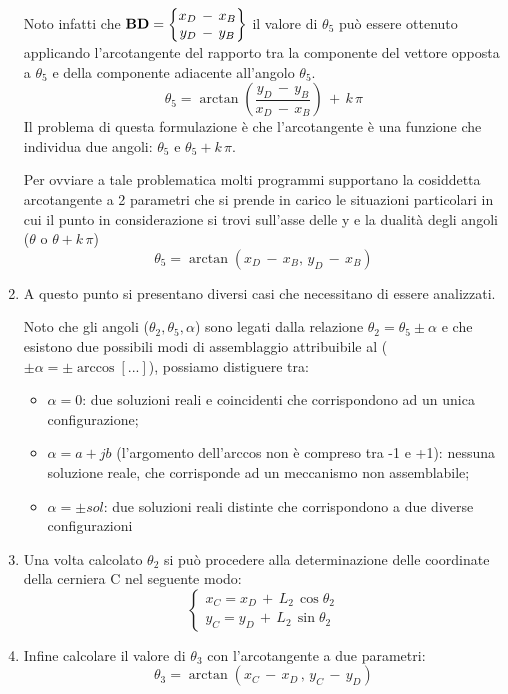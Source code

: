 \begin{enumerate}
		 Noto infatti che $\mathbf{BD} = \begin{Bmatrix}x_D\,-\,x_B\\y_D\,-\,y_B\end{Bmatrix}$ il valore di $\theta_5$ può essere ottenuto applicando l'arcotangente del rapporto tra la componente del vettore opposta a $\theta_5$ e della componente adiacente all'angolo $\theta_5$.
		 \[\theta_5 = \arctan{(\frac{y_D\,-\,y_B}{x_D\,-\,x_B})}\,+\,k\,\pi\]
		 Il problema di questa formulazione è che l'arcotangente è una funzione che individua due angoli: $\theta_5$ e $\theta_5 + k\,\pi$.
		 
		 Per ovviare a tale problematica molti programmi supportano la cosiddetta arcotangente a 2 parametri che si prende in carico le situazioni particolari in cui il punto in considerazione si trovi sull'asse delle y e la dualità degli angoli ($\theta$ o $\theta + k\,\pi$)
		 \[\theta_5 = \arctan{(x_D\,-\,x_B,\,y_D\,-\,x_B)}\]
		 \item A questo punto si presentano diversi casi che necessitano di essere analizzati.
		 
		 Noto che gli angoli ($\theta_2, \theta_5 , \alpha$) sono legati dalla relazione $\theta_2 = \theta_5 \pm \alpha$ e che esistono due possibili modi di assemblaggio attribuibile al ($\pm \alpha = \pm \arccos{[...]}$), possiamo distiguere tra:
		 \begin{itemize}
		 \item $\alpha = 0$: due soluzioni reali e coincidenti che corrispondono ad un unica configurazione;
		 \item $\alpha = a + j b$ (l'argomento dell'arccos non è compreso tra -1 e +1): nessuna soluzione reale, che corrisponde ad un meccanismo non assemblabile;
		 \item $\alpha = \pm sol$: due soluzioni reali distinte che corrispondono a due diverse configurazioni
		 \end{itemize}
		 
		 \item Una volta calcolato $\theta_2$ si può procedere alla determinazione delle coordinate della cerniera C nel seguente modo:
		 \[
		 \begin{cases}
		 	x_C = x_D\,+\,L_2\,\cos{\theta_2}\\
		 	y_C = y_D\,+\,L_2\,\sin{\theta_2}
		 \end{cases}
		 \]
		 \item Infine calcolare il valore di $\theta_3$ con l'arcotangente a due parametri:
		 \[\theta_3 = \arctan{(x_C\,-\,x_D\,,\,y_C\,-\,y_D)}\]
	\end{enumerate}
	
